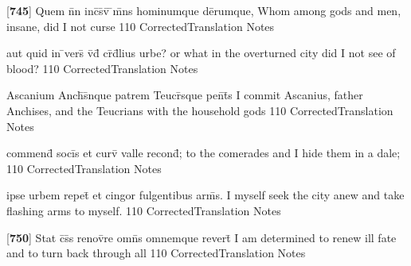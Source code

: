 \latline
  {[\textbf{745}] Quem n\={}n inc\={}s\={}v\={\macron {\i}} \={}m\={}ns hominumque de\={}rumque,}
  { Whom among gods and men, insane, did I not curse }
  {110}
  { CorrectedTranslation }
  { Notes }


\latline
  {aut quid in \={}vers\={} v\={\macron {\i}}d\={\macron {\i}} cr\={}d\={}lius urbe?}
  { or what in the overturned city did I not see of blood? }
  {110}
  { CorrectedTranslation }
  { Notes }


\latline
  {Ascanium Anch\={\macron {\i}}s\={}nque patrem Teucr\={}sque pen\={}t\={\macron {\i}}s}
  { I commit Ascanius, father Anchises, and the Teucrians with the household gods  }
  {110}
  { CorrectedTranslation }
  { Notes }


\latline
  {commend\={} soci\={\macron {\i}}s et curv\={} valle recond\={};}
  { to the comerades and I hide them in a dale; }
  {110}
  { CorrectedTranslation }
  { Notes }


\latline
  {ipse urbem repet\={} et cingor fulgentibus arm\={\macron {\i}}s.}
  { I myself seek the city anew and take flashing arms to myself. }
  {110}
  { CorrectedTranslation }
  { Notes }


\latline
  {[\textbf{750}] Stat c\={}s\={}s renov\={}re omn\={\macron {\i}}s omnemque revert\={\macron {\i}}}
  { I am determined to renew ill fate and to turn back through all  }
  {110}
  { CorrectedTranslation }
  { Notes }


